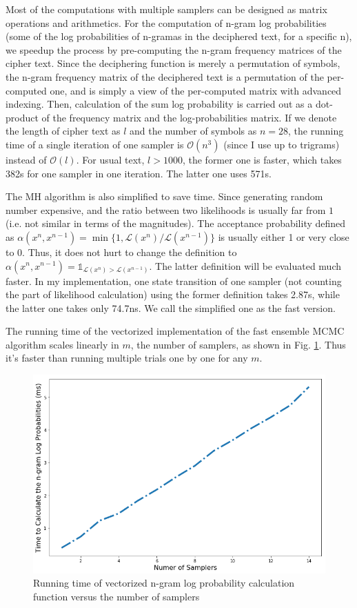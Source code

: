 \documentclass[10pt, twocolumn]{article}
\begin{document}
Most of the computations with multiple samplers can be designed as matrix operations and arithmetics. For the computation of n-gram log probabilities (some of the log probabilities of n-gramas in the deciphered text, for a specific n), we speedup the process by pre-computing the n-gram frequency matrices of the cipher text. Since the deciphering function is merely a permutation of symbols, the n-gram frequency matrix of the deciphered text is a permutation of the per-computed one, and is simply a view of the per-computed matrix with advanced indexing. Then, calculation of the sum log probability is carried out as a dot-product of the frequency matrix and the log-probabilities matrix. If we denote the length of cipher text as $l$ and the number of symbols as $n=28$, the running time of a single iteration of one sampler is $\mathcal{O}(n^3)$ (since I use up to trigrams) instead of $\mathcal{O}(l)$. For usual text, $l>1000$, the former one is faster, which takes 382\textmu s for one sampler in one iteration. The latter one uses 571\textmu s.

The MH algorithm is also simplified to save time. Since generating random number expensive, and the ratio between two likelihoods is usually far from $1$ (i.e. not similar in terms of the magnitudes). The acceptance probability defined as $\alpha(x^n, x^{n-1})=\min\{1, \mathcal{L}(x^n)/\mathcal{L}(x^{n-1})\}$ is usually either 1 or very close to 0. Thus, it does not hurt to change the definition to $\alpha(x^n, x^{n-1})=\mathds{1}_{\mathcal{L}(x^n)>\mathcal{L}(x^{n-1})}$. The latter definition will be evaluated much faster. In my implementation, one state transition of one sampler (not counting the part of likelihood calculation) using the former definition takes 2.87\textmu s, while the latter one takes only 74.7ns. We call the simplified one as the fast version.

The running time of the vectorized implementation of the fast ensemble MCMC algorithm scales linearly in $m$, the number of samplers, as shown in Fig. \ref{fig:ensemble_cal_time}. Thus it's faster than running multiple trials one by one for any $m$.
\begin{figure}[t]
	\centering
	\includegraphics[width=0.9\linewidth]{pics/ensemble_cal_time.png}
	\caption{Running time of vectorized n-gram log probability calculation function versus the number of samplers}
	\label{fig:ensemble_cal_time}
\end{figure}
\end{document}
